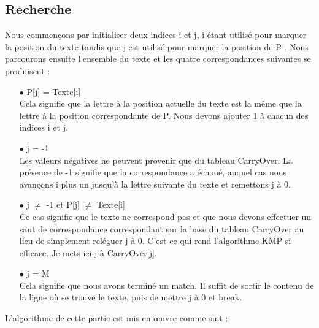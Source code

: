 \documentclass[11pt,english]{article}
\begin{document}
\subsection{Recherche}

\indent 

Nous commençons par initialiser deux indices i et j, i étant utilisé pour marquer la position du texte tandis que j est utilisé pour marquer la position de P .
Nous parcourons ensuite l'ensemble du texte et les quatre correspondances suivantes se produisent :

\begin{itemize}
    \item [$\bullet$] P[j] = Texte[i]
    \\
    Cela signifie que la lettre à la position actuelle du texte est la même que la lettre à la position correspondante de P. Nous devons ajouter 1 à chacun des indices i et j.
    \item [$\bullet$] j = -1
    \\
    Les valeurs négatives ne peuvent provenir que du tableau CarryOver. La présence de -1 signifie que la correspondance a échoué, auquel cas nous avançons i plus un jusqu'à la lettre suivante du texte et remettons j à 0.
    \item [$\bullet$] j $\neq$ -1 et P[j] $\neq$ Texte[i]
    \\
    Ce cas signifie que le texte ne correspond pas et que nous devons effectuer un saut de correspondance correspondant sur la base du tableau CarryOver au lieu de simplement reléguer j à 0. C'est ce qui rend l'algorithme KMP si efficace. Je mets ici j à CarryOver[j].
    \item [$\bullet$] j = M
    \\
    Cela signifie que nous avons terminé un match. Il suffit de sortir le contenu de la ligne où se trouve le texte, puis de mettre j à 0 et break. 

\end{itemize}

\indent L'algorithme de cette partie est mis en œuvre comme suit :
\end{document}
